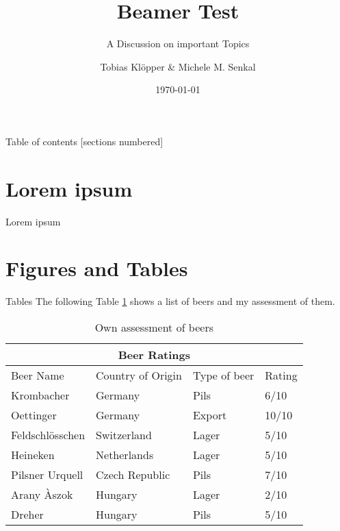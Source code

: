 \documentclass[10pt]{beamer}
\title{Beamer Test}
\subtitle{A Discussion on important Topics}
\date{\today}
\author{Tobias Klöpper
& 
Michele M. Senkal}
\institute{Institute for Brewing and Degustation}
\begin{document}
\maketitle

\begin{frame}{Table of contents}
  [sections numbered]
  \tableofcontents%
\end{frame}

\section{Lorem ipsum}
\begin{frame}{Lorem ipsum}
\blindtext
\end{frame}

\section{Figures and Tables}
\begin{frame}{Tables}
The following Table \ref{table:1} shows a list of beers and my assessment of them.
\begin{table}[h!]
\begin{tabular}{ |p{3cm}||p{3cm}|p{2cm}|p{1cm}|  }
 \hline
 \multicolumn{4}{|c|}{Beer Ratings} \\
 \hline
 Beer Name & Country of Origin &Type of beer&Rating\\
 \hline
 Krombacher   & Germany    & Pils &   6/10\\
 Oettinger&   Germany  & Export   &10/10\\
 Feldschlösschen &Switzerland & Lager &  5/10\\
 Heineken    &Netherlands & Lager &  5/10\\
 Pilsner Urquell&   Czech Republic  & Pils & 7/10\\
 Arany Àszok& Hungary  & Lager   & 2/10\\
 Dreher& Hungary  & Pils & 5/10\\
 \hline
 \end{tabular}
 \caption{Own assessment of beers}
 \label{table:1}
\end{table}
\end{frame}
\end{document}
